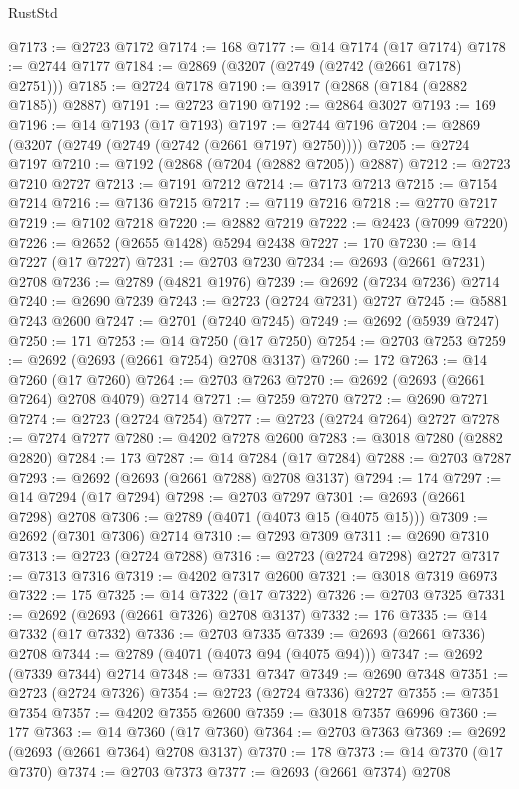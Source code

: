\begin{lexlean}{RustStd}
\begin{coremodule}
@7173 := @2723 @7172
@7174 := 168
@7177 := @14 @7174 (@17 @7174)
@7178 := @2744 @7177
@7184 := @2869 (@3207 (@2749 (@2742 (@2661 @7178) @2751)))
@7185 := @2724 @7178
@7190 := @3917 (@2868 (@7184 (@2882 @7185)) @2887)
@7191 := @2723 @7190
@7192 := @2864 @3027
@7193 := 169
@7196 := @14 @7193 (@17 @7193)
@7197 := @2744 @7196
@7204 := @2869 (@3207 (@2749 (@2749 (@2742 (@2661 @7197) @2750))))
@7205 := @2724 @7197
@7210 := @7192 (@2868 (@7204 (@2882 @7205)) @2887)
@7212 := @2723 @7210 @2727
@7213 := @7191 @7212
@7214 := @7173 @7213
@7215 := @7154 @7214
@7216 := @7136 @7215
@7217 := @7119 @7216
@7218 := @2770 @7217
@7219 := @7102 @7218
@7220 := @2882 @7219
@7222 := @2423 (@7099 @7220)
@7226 := @2652 (@2655 @1428) @5294 @2438
@7227 := 170
@7230 := @14 @7227 (@17 @7227)
@7231 := @2703 @7230
@7234 := @2693 (@2661 @7231) @2708
@7236 := @2789 (@4821 @1976)
@7239 := @2692 (@7234 @7236) @2714
@7240 := @2690 @7239
@7243 := @2723 (@2724 @7231) @2727
@7245 := @5881 @7243 @2600
@7247 := @2701 (@7240 @7245)
@7249 := @2692 (@5939 @7247)
@7250 := 171
@7253 := @14 @7250 (@17 @7250)
@7254 := @2703 @7253
@7259 := @2692 (@2693 (@2661 @7254) @2708 @3137)
@7260 := 172
@7263 := @14 @7260 (@17 @7260)
@7264 := @2703 @7263
@7270 := @2692 (@2693 (@2661 @7264) @2708 @4079) @2714
@7271 := @7259 @7270
@7272 := @2690 @7271
@7274 := @2723 (@2724 @7254)
@7277 := @2723 (@2724 @7264) @2727
@7278 := @7274 @7277
@7280 := @4202 @7278 @2600
@7283 := @3018 @7280 (@2882 @2820)
@7284 := 173
@7287 := @14 @7284 (@17 @7284)
@7288 := @2703 @7287
@7293 := @2692 (@2693 (@2661 @7288) @2708 @3137)
@7294 := 174
@7297 := @14 @7294 (@17 @7294)
@7298 := @2703 @7297
@7301 := @2693 (@2661 @7298) @2708
@7306 := @2789 (@4071 (@4073 @15 (@4075 @15)))
@7309 := @2692 (@7301 @7306) @2714
@7310 := @7293 @7309
@7311 := @2690 @7310
@7313 := @2723 (@2724 @7288)
@7316 := @2723 (@2724 @7298) @2727
@7317 := @7313 @7316
@7319 := @4202 @7317 @2600
@7321 := @3018 @7319 @6973
@7322 := 175
@7325 := @14 @7322 (@17 @7322)
@7326 := @2703 @7325
@7331 := @2692 (@2693 (@2661 @7326) @2708 @3137)
@7332 := 176
@7335 := @14 @7332 (@17 @7332)
@7336 := @2703 @7335
@7339 := @2693 (@2661 @7336) @2708
@7344 := @2789 (@4071 (@4073 @94 (@4075 @94)))
@7347 := @2692 (@7339 @7344) @2714
@7348 := @7331 @7347
@7349 := @2690 @7348
@7351 := @2723 (@2724 @7326)
@7354 := @2723 (@2724 @7336) @2727
@7355 := @7351 @7354
@7357 := @4202 @7355 @2600
@7359 := @3018 @7357 @6996
@7360 := 177
@7363 := @14 @7360 (@17 @7360)
@7364 := @2703 @7363
@7369 := @2692 (@2693 (@2661 @7364) @2708 @3137)
@7370 := 178
@7373 := @14 @7370 (@17 @7370)
@7374 := @2703 @7373
@7377 := @2693 (@2661 @7374) @2708

\end{coremodule}
\end{lexlean}
